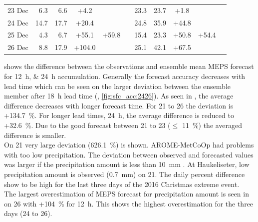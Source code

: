 \begin{table}[t]
\begin{center}
\begin{tabular}{c||r|r|c|c|c||r|r|c|c|c}
			\num{23} Dec & \num{6.3} & \num{6.6} & +\num{4.2} & & & \num{23.3} & \num{23.7} & +\num{1.8} &  &  \\\cline{1-5}\cline{7-10}
			\num{24} Dec & \num{14.7} & \num{17.7} & +\num{20.4} & \multirow{3}{*}{+\num{59.8}} & & \num{24.8} & \num{35.9} & +\num{44.8} & \multirow{3}{*}{+\num{54.4}}  &  \\\cline{1-4}\cline{7-9}
			\num{25} Dec & \num{4.3} & \num{6.7} & +\num{55.1} & & & \num{15.4} & \num{23.3} & +\num{50.8} & &   \\\cline{1-4}\cline{7-9}
			\num{26} Dec & \num{8.8} & \num{17.9} & +\num{104.0} & & & \num{25.1} & \num{42.1} & +\num{67.5} &  &  \\\hline\hline
		\end{tabular}
	\end{center}
\end{table}
\noindent
{} shows the difference between the observations and ensemble mean MEPS forecast for \SIlist{12;24}{\hour} accumulation. Generally the forecast accuracy decreases with lead time which can be seen on the larger deviation between the ensemble member after \SI{18}{\hour} lead time (, \ref{fig:sfc_acc:2426}). As seen in , the average difference decreases with longer forecast time. For \num{21} to \SI{26}{\dec} the deviation is +\SI{134.7}{\percent}. For longer lead times, \SI{24}{\hour}, the average difference is reduced to +\SI{32.6}{\percent}. Due to the good forecast between \num{21} to \SI{23}{\dec} ($\le$ \SI{11}{\percent}) the averaged difference is smaller. 
\\
On \SI{21}{\dec} very large deviation (\SI{626.1}{\percent}) is shown. 
AROME-MetCoOp had problems with too low precipitation. The deviation between observed and forecasted values was larger if the precipitation amount is less than \SI{10}{\mm} \citep{muller_arome-metcoop:_2017}. At Haukeliseter, low precipitation amount is observed (\SI{0.7}{\mm}) on \SI{21}{\dec}.
The daily percent difference show to be high for the last three days of the 2016 Christmas extreme event.  
\\
The largest overestimation of MEPS forecast for precipitation amount is seen in  on \SI{26}{\dec} with +\SI{104}{\percent} for \SI{12}{\hour}. This shows the highest overestimation for the three days (\num{24} to \SI{26}{\dec}).

